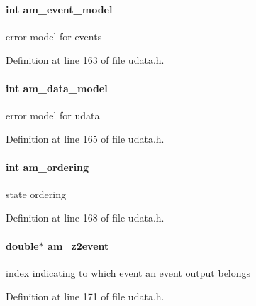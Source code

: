 \paragraph[{am\+\_\+event\+\_\+model}]{\setlength{\rightskip}{0pt plus 5cm}int am\+\_\+event\+\_\+model}\label{struct_user_data_ace3cae0f78a3365a5fac7d7daa9928ff}
error model for events 

Definition at line 163 of file udata.\+h.

\hypertarget{struct_user_data_a83373144a2adb9f97cdfca2dfc79ce80}{}
\paragraph[{am\+\_\+data\+\_\+model}]{\setlength{\rightskip}{0pt plus 5cm}int am\+\_\+data\+\_\+model}\label{struct_user_data_a83373144a2adb9f97cdfca2dfc79ce80}
error model for udata 

Definition at line 165 of file udata.\+h.

\hypertarget{struct_user_data_a260a14e35469f1516b194f4f065a9794}{}
\paragraph[{am\+\_\+ordering}]{\setlength{\rightskip}{0pt plus 5cm}int am\+\_\+ordering}\label{struct_user_data_a260a14e35469f1516b194f4f065a9794}
state ordering 

Definition at line 168 of file udata.\+h.

\hypertarget{struct_user_data_af16fc75b57c68ab1d3784cc71ab073a9}{}
\paragraph[{am\+\_\+z2event}]{\setlength{\rightskip}{0pt plus 5cm}double$\ast$ am\+\_\+z2event}\label{struct_user_data_af16fc75b57c68ab1d3784cc71ab073a9}
index indicating to which event an event output belongs 

Definition at line 171 of file udata.\+h.

\hypertarget{struct_user_data_a1a976a80dc74446059468485a0f279e1}{}
